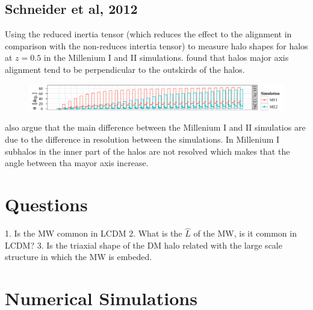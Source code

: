 \documentclass[12pt]{article}
\begin{document}
\subsection{Schneider et al, 2012}

Using the reduced inertia tensor (which reduces the effect to the alignment
in comparison with the non-reduces intertia tensor) to measure halo 
shapes for halos
at $z=0.5$ in the Millenium I and II simulations. \citep{scheider12}
found that halos major axis alignment tend to be perpendicular to the outskirds
of the halos.  

\begin{figure}[H]
\includegraphics[scale=0.5]{schneideralignments.png}
\end{figure}

\citep{schneider12} also argue that the main difference between the 
Millenium I and II simulatios are due to the difference in resolution 
between the simulations. In Millenium I subhalos in the inner part 
of the halos are not resolved which makes that the angle between 
tha mayor axis increase. 

\section{Questions}

1. Is the MW common in LCDM
2. What is the $\hat{L}$ of the MW, is it common in LCDM?
3. Is the triaxial shape of the DM halo related with the large
scale structure in which the MW is embeded.


\section{Numerical Simulations}



\end{document}
